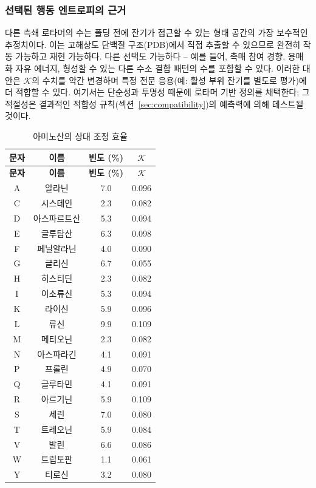 \documentclass[12pt,a4paper]{article}
\newcommand{\REL}{\mathcal{K}}          %
\begin{document}
	\subsubsection*{선택된 행동 엔트로피의 근거}
	다른 측쇄 로타머의 수는 폴딩 전에 잔기가 접근할 수 있는 형태 공간의 가장 보수적인 추정치이다.
	이는 고해상도 단백질 구조(PDB)에서 직접 추출할 수 있으므로 완전히 작동 가능하고 재현 가능하다.
	다른 선택도 가능하다 – 예를 들어, 촉매 참여 경향, 용매화 자유 에너지, 형성할 수 있는 다른 수소 결합 패턴의 수를 포함할 수 있다.
	이러한 대안은 \(\REL\)의 수치를 약간 변경하며 특정 전문 응용(예: 활성 부위 잔기를 별도로 평가)에 더 적합할 수 있다.
	여기서는 단순성과 투명성 때문에 로타머 기반 정의를 채택한다; 그 적절성은 결과적인 적합성 규칙(섹션~\ref{sec:compatibility})의 예측력에 의해 테스트될 것이다.
	
	\begin{longtable}{|c|c|c|c|}
		\caption{아미노산의 상대 조정 효율}\label{tab:amino}\\
		\hline
		\textbf{문자} & \textbf{이름} & \textbf{빈도 (\%)} & \(\REL\) \\
		\hline
		\endfirsthead
		\hline
		\textbf{문자} & \textbf{이름} & \textbf{빈도 (\%)} & \(\REL\) \\
		\hline
		\endhead
		\hline
		A & 알라닌 & 7.0 & 0.096 \\
		C & 시스테인 & 2.3 & 0.082 \\
		D & 아스파르트산 & 5.3 & 0.094 \\
		E & 글루탐산 & 6.3 & 0.098 \\
		F & 페닐알라닌 & 4.0 & 0.090 \\
		G & 글리신 & 6.7 & 0.055 \\
		H & 히스티딘 & 2.3 & 0.082 \\
		I & 이소류신 & 5.3 & 0.094 \\
		K & 라이신 & 5.9 & 0.096 \\
		L & 류신 & 9.9 & 0.109 \\
		M & 메티오닌 & 2.3 & 0.082 \\
		N & 아스파라긴 & 4.1 & 0.091 \\
		P & 프롤린 & 4.9 & 0.070 \\
		Q & 글루타민 & 4.1 & 0.091 \\
		R & 아르기닌 & 5.9 & 0.109 \\
		S & 세린 & 7.0 & 0.080 \\
		T & 트레오닌 & 5.9 & 0.084 \\
		V & 발린 & 6.6 & 0.086 \\
		W & 트립토판 & 1.1 & 0.061 \\
		Y & 티로신 & 3.2 & 0.080 \\
		\hline
	\end{longtable}
	
\end{document}
